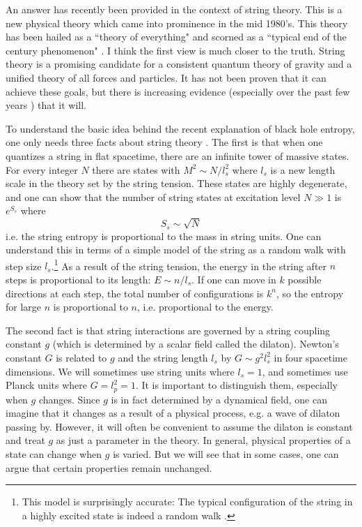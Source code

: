 \documentclass[12pt]{article}
\newcommand{\eq}{\begin{equation}}
\newcommand{\eqe}{\end{equation}}
\begin{document}
An answer has recently been provided in the context of string theory.
This is a new physical theory which came into prominence in the mid
1980's. This theory has been hailed as a ``theory of everything" and
scorned as a ``typical end of the century phenomenon" \cite{anon}.
I think the first
view is much closer to the truth. String theory
is a promising candidate for a consistent quantum theory of gravity
and a unified theory of all forces and particles. It has not been proven
that it can achieve these goals, but there is increasing evidence
(especially over the past few years \cite{vafa}) that it will.

To understand the basic idea behind the recent explanation of
black hole entropy, one only needs
three facts about string theory \cite{gsw}. The first is that when one quantizes
a string in flat spacetime, there are an infinite tower of massive states.
For every integer $N$ there are states with $M^2 \sim N/l_s^2$ where $l_s$ is
a new length scale in the theory set by the string tension. These states
are highly degenerate, and one can show that
the number of string states at excitation level $N\gg 1$ is $e^{S_s}$ where
\eq
S_s \sim \sqrt N
\eqe
i.e. the string entropy is proportional to the mass in string units. One can
understand this in terms of a simple model of the string as a random walk
with step size $l_s$.\footnote{This model is surprisingly accurate: The
typical configuration of the string in a highly excited state is indeed a
random walk \cite{mitu}.} As a result of the string tension, the energy 
in the string after $n$ steps is
proportional to its length: $E\sim n/l_s$.
If one can move in $k$ possible directions at each step, the total number of
configurations is $k^n$, so the entropy for large $n$ is proportional to
$n$, i.e. proportional to the energy.

The second fact is that string interactions are governed by a string coupling
constant $g$ (which is determined by a scalar field called the dilaton).
Newton's constant $G$ is related to $g$ and the string length $l_s$
by $G \sim g^2 l_s^2$ in four spacetime dimensions. We will sometimes use
string units where $l_s=1$, and sometimes use Planck units where $G = l_p^2 =1$.
It is important to distinguish them, especially when $g$ changes.
 Since $g$ is in fact determined by a dynamical
field, one can imagine that it changes as a result of a physical process,
e.g. a wave of dilaton passing by. However, it will often be convenient
to assume the dilaton is constant and treat $g$ as just a parameter in 
the theory. In general, physical properties of a state can change
when $g$ is varied. But we will see that
in some cases, one can argue that certain 
properties remain unchanged.
\end{document}
